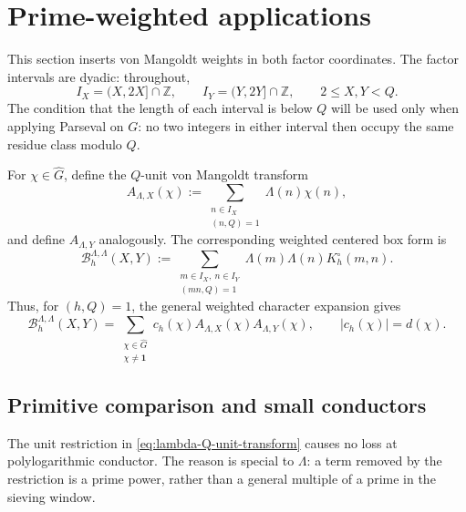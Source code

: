 \section{Prime-weighted applications}
\label{sec:prime-weighted-applications}

This section inserts von Mangoldt weights in both factor coordinates.  The
factor intervals are dyadic: throughout,
\begin{equation}
 I_X=(X,2X]\cap\mathbb Z,
 \qquad
 I_Y=(Y,2Y]\cap\mathbb Z,
 \qquad
 2\le X,Y<Q.
 \label{eq:lambda-dyadic-intervals}
\end{equation}
The condition that the length of each interval is below $Q$ will be used only
when applying Parseval on $G$: no two integers in either interval then occupy
the same residue class modulo $Q$.

For $\chi\in\widehat G$, define the $Q$-unit von Mangoldt transform
\begin{equation}
 A_{\Lambda,X}(\chi)
 :=\sum_{\substack{n\in I_X\\(n,Q)=1}}\Lambda(n)\chi(n),
 \label{eq:lambda-Q-unit-transform}
\end{equation}
and define $A_{\Lambda,Y}$ analogously.  The corresponding weighted centered
box form is
\begin{equation}
 \mathcal B_h^{\Lambda,\Lambda}(X,Y)
 :=\sum_{\substack{m\in I_X,\ n\in I_Y\\(mn,Q)=1}}
 \Lambda(m)\Lambda(n)K_h^\circ(m,n).
 \label{eq:lambda-weighted-box-form}
\end{equation}
Thus, for $(h,Q)=1$, the general weighted character expansion gives
\begin{equation}
 \mathcal B_h^{\Lambda,\Lambda}(X,Y)
 =\sum_{\substack{\chi\in\widehat G\\\chi\ne\mathbf 1}}
 c_h(\chi)A_{\Lambda,X}(\chi)A_{\Lambda,Y}(\chi),
 \qquad |c_h(\chi)|=d(\chi).
 \label{eq:lambda-weighted-character-expansion}
\end{equation}

\subsection{Primitive comparison and small conductors}
\label{subsec:lambda-small-conductors}

The unit restriction in \eqref{eq:lambda-Q-unit-transform} causes no loss at
polylogarithmic conductor.  The reason is special to $\Lambda$: a term removed
by the restriction is a prime power, rather than a general multiple of a
prime in the sieving window.

